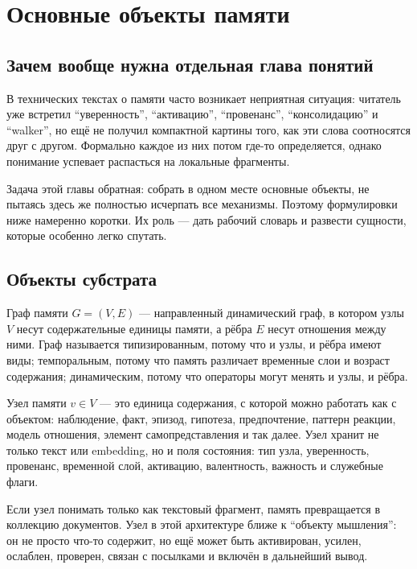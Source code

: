 \chapter{Основные объекты памяти}
\label{ch:definitions}

\section{Зачем вообще нужна отдельная глава понятий}

В технических текстах о памяти часто возникает неприятная ситуация: читатель
уже встретил ``уверенность'', ``активацию'', ``провенанс'', ``консолидацию'' и
``walker'', но ещё не получил компактной картины того, как эти слова
соотносятся друг с другом. Формально каждое из них потом где-то определяется,
однако понимание успевает распасться на локальные фрагменты.

Задача этой главы обратная: собрать в одном месте основные объекты, не
пытаясь здесь же полностью исчерпать все механизмы. Поэтому формулировки
ниже намеренно коротки. Их роль --- дать рабочий словарь и развести сущности,
которые особенно легко спутать.

\section{Объекты субстрата}

\begin{definition}
Граф памяти $G = (V, E)$ --- направленный динамический граф, в котором узлы
$V$ несут содержательные единицы памяти, а рёбра $E$ несут отношения между
ними. Граф называется типизированным, потому что и узлы, и рёбра имеют виды;
темпоральным, потому что память различает временные слои и возраст
содержания; динамическим, потому что операторы могут менять и узлы, и рёбра.
\end{definition}

\begin{definition}
Узел памяти $v \in V$ --- это единица содержания, с которой можно работать как
с объектом: наблюдение, факт, эпизод, гипотеза, предпочтение, паттерн
реакции, модель отношения, элемент самопредставления и так далее. Узел хранит
не только текст или embedding, но и поля состояния: тип узла, уверенность,
провенанс, временной слой, активацию, валентность, важность и служебные
флаги.
\end{definition}

\begin{intuition}
Если узел понимать только как текстовый фрагмент, память превращается в
коллекцию документов. Узел в этой архитектуре ближе к ``объекту мышления'':
он не просто что-то содержит, но ещё может быть активирован, усилен, ослаблен,
проверен, связан с посылками и включён в дальнейший вывод.
\end{intuition}

